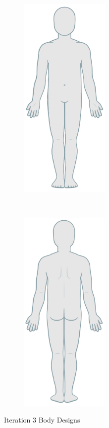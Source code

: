 \clearpage
\begin{figure}[t!]
    \centering
    \begin{subfigure}[t]{0.5\textwidth}
        \centering
        \includegraphics[height=10cm]{figures/bodydesign3front.jpg}
    \end{subfigure}%
    ~
    \begin{subfigure}[t]{0.5\textwidth}
        \centering
        \includegraphics[height=10cm]{figures/bodydesign3back.jpg}
    \end{subfigure}
    \caption{Iteration 3 Body Designs}
    \label{fig:it3design}
\end{figure}

